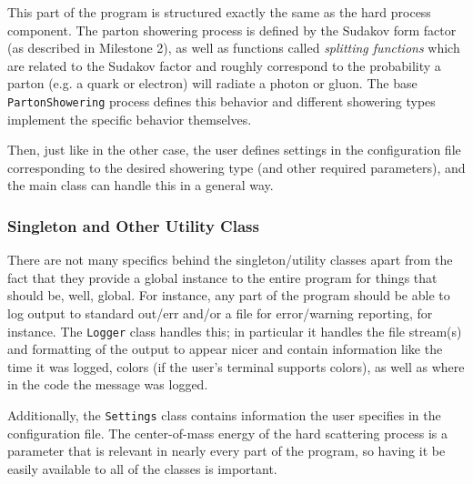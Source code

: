 \documentclass[titlepage]{article}
\begin{document}
This part of the program is structured exactly the same as the hard process component. The parton showering process is defined by the Sudakov form factor (as described in Milestone 2), as well as functions called \textit{splitting functions} which are related to the Sudakov factor and roughly correspond to the probability a parton (e.g. a quark or electron) will radiate a photon or gluon. The base \texttt{PartonShowering} process defines this behavior and different showering types implement the specific behavior themselves.

Then, just like in the other case, the user defines settings in the configuration file corresponding to the desired showering type (and other required parameters), and the main class can handle this in a general way.

\subsubsection*{Singleton and Other Utility Class}

There are not many specifics behind the singleton/utility classes apart from the fact that they provide a global instance to the entire program for things that should be, well, global. For instance, any part of the program should be able to log output to standard out/err and/or a file for error/warning reporting, for instance. The \texttt{Logger} class handles this; in particular it handles the file stream(s) and formatting of the output to appear nicer and contain information like the time it was logged, colors (if the user's terminal supports colors), as well as where in the code the message was logged.

Additionally, the \texttt{Settings} class contains information the user specifies in the configuration file. The center-of-mass energy of the hard scattering process is a parameter that is relevant in nearly every part of the program, so having it be easily available to all of the classes is important.
\end{document}
